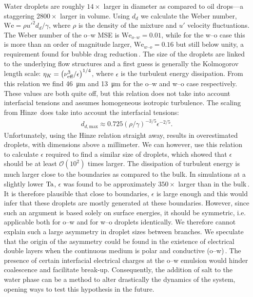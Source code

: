 Water droplets are roughly $14\times$ larger in diameter as compared to oil
drops---a staggering $2800\times$ larger in volume.
Using $d_d$ we calculate the Weber number, $\text{We}=\rho u'^2 d_d / \gamma$,
where $\rho$ is the density of the mixture and $u'$ velocity fluctuations.
The Weber number of the o--w MSE is $\text{We}_{o\text{--}w}=0.01$, while for the
w--o case this is more than an order of magnitude larger,
$\text{We}_{w\text{--}o}=0.16$ but still below unity, a requirement found for bubble
drag reduction\,\cite{vandenBerg2007, Verschoof2016}.
The size of the droplets are linked to the underlying flow structures and a
first guess is generally the Kolmogorov length scale:
$\eta_K=\left(\nu_\text{eff}^3/\epsilon \right)^{1/4}$, where $\epsilon$ is the
turbulent energy dissipation. 
From this relation we find \SI{46}{\micro\metre} and \SI{13}{\micro\metre} for
the o--w and w--o case respectively.
These values are both quite off, but this relation does not take into account
interfacial tensions and assumes homogeneous isotropic turbulence.
The scaling from Hinze\,\cite{Hinze1955} does take into account the
interfacial tensions:
\begin{align}
d_{d,\text{max}} \approx 0.725 \left(\rho/\gamma\right)^{-3/5} \epsilon^{-2/5}.
\end{align}
Unfortunately, using the Hinze relation straight away, results in overestimated
droplets, with dimensions above a millimeter.
We can however, use this relation to calculate $\epsilon$ required to find a
similar size of droplets, which showed that $\epsilon$ should be at least
$\mathcal{O}(10^2)$ times larger.
The dissipation of turbulent energy is much larger close to the boundaries as
compared to the bulk.
In simulations at a slightly lower $\text{Ta}$, $\epsilon$ was found to be
approximately $350\times$ larger than in the bulk\,\cite{Zhu2017}.
It is therefore plausible that close to boundaries, $\epsilon$ is large
enough and this would infer that these droplets are mostly generated at
these boundaries.
However, since such an argument is based solely on surface energies, it should be symmetric, i.e. applicable both for o--w and for w--o droplets identically. We therefore cannot explain such a large asymmetry in droplet
sizes between branches. We speculate that the origin of the asymmetry could be found in the existence of electrical double layers when the continuous medium is polar and conductive (o--w)\,\cite{Gu1998, Eastoe2007}. The presence of certain interfacial electrical charges at the o--w emulsion would hinder coalescence and facilitate break-up. Consequently, the addition of salt to the water phase can be a method to alter drastically the dynamics of the system, opening ways to test this hypothesis in the future. \\
\ifdefined\thesissections%

